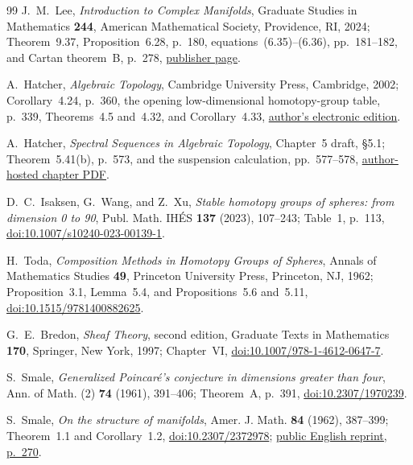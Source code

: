 \begin{thebibliography}{99}
J.~M.~Lee,
\emph{Introduction to Complex Manifolds},
Graduate Studies in Mathematics \textbf{244}, American Mathematical Society,
Providence, RI, 2024; Theorem~9.37,
Proposition~6.28, p.~180, equations~(6.35)--(6.36), pp.~181--182,
and Cartan theorem~B, p.~278,
\href{https://bookstore.ams.org/gsm-244}{publisher page}.

A.~Hatcher,
\emph{Algebraic Topology},
Cambridge University Press, Cambridge, 2002; Corollary~4.24, p.~360,
the opening low-dimensional homotopy-group table, p.~339,
Theorems~4.5 and~4.32, and Corollary~4.33,
\href{https://pi.math.cornell.edu/~hatcher/AT/ATpage.html}{author's electronic edition}.

A.~Hatcher,
\emph{Spectral Sequences in Algebraic Topology}, Chapter~5 draft,
\S5.1; Theorem~5.41(b), p.~573, and the suspension calculation,
pp.~577--578,
\href{https://pi.math.cornell.edu/~hatcher/AT/ATch5.pdf}%
{author-hosted chapter PDF}.

D.~C.~Isaksen, G.~Wang, and Z.~Xu,
\emph{Stable homotopy groups of spheres: from dimension 0 to 90},
Publ. Math. IH\'ES \textbf{137} (2023), 107--243; Table~1, p.~113,
\href{https://doi.org/10.1007/s10240-023-00139-1}%
{doi:10.1007/s10240-023-00139-1}.

H.~Toda,
\emph{Composition Methods in Homotopy Groups of Spheres},
Annals of Mathematics Studies \textbf{49}, Princeton University Press,
Princeton, NJ, 1962; Proposition~3.1, Lemma~5.4, and
Propositions~5.6 and~5.11,
\href{https://doi.org/10.1515/9781400882625}%
{doi:10.1515/9781400882625}.

G.~E.~Bredon,
\emph{Sheaf Theory}, second edition,
Graduate Texts in Mathematics \textbf{170}, Springer, New York, 1997;
Chapter~VI,
\href{https://doi.org/10.1007/978-1-4612-0647-7}{doi:10.1007/978-1-4612-0647-7}.

S.~Smale,
\emph{Generalized Poincar\'e's conjecture in dimensions greater than four},
Ann. of Math. (2) \textbf{74} (1961), 391--406; Theorem~A, p.~391,
\href{https://doi.org/10.2307/1970239}{doi:10.2307/1970239}.

S.~Smale,
\emph{On the structure of manifolds},
Amer. J. Math. \textbf{84} (1962), 387--399;
Theorem~1.1 and Corollary~1.2,
\href{https://doi.org/10.2307/2372978}{doi:10.2307/2372978};
\href{https://www.sas.rochester.edu/mth/sites/doug-ravenel/otherpapers/Novikov-Cobordism.pdf}%
{public English reprint, p.~270}.


\end{thebibliography}
